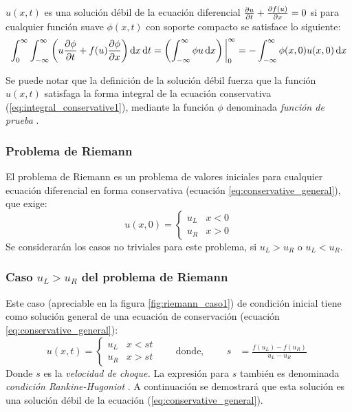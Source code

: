 \documentclass[12pt]{article}
\begin{document}
	
	
	\begin{definition}
		$u(x,t)$ es una solución débil de la ecuación diferencial $\pdv{u}{t} + \pdv{f(u)}{x}=0$ si para cualquier función suave $\phi(x,t)$ con soporte compacto se satisface lo siguiente:
		\begin{equation}
			\int_{0}^{\infty}\int_{-\infty}^{\infty}\left( u\pdv{\phi}{t} + f(u)\pdv{\phi}{x}\right)\dd{x}\dd{t}=\left( \int_{-\infty}^{\infty} \phi u \dd{x} \right)\bigg|_{0}^{\infty}=-\int_{-\infty}^{\infty}\phi (x,0)u(x,0)\dd{x}
			\label{eq:weak_sol_cond}
		\end{equation}
	\end{definition}
	Se puede notar que la definición de la solución débil fuerza que la función $u(x,t)$ satisfaga la forma integral de la ecuación conservativa (\ref{eq:integral_conservative1}), mediante la función $\phi$ denominada \textit{función de prueba} \cite{Cameron}.
	
	\subsubsection{Problema de Riemann}
	El problema de Riemann es un problema de valores iniciales para cualquier ecuación diferencial en forma conservativa (ecuación \ref{eq:conservative_general}), que exige:
	\begin{equation}
		u(x,0) =
		\begin{cases}
			u_{L} & x < 0 \\
			u_{R} & x > 0
		\end{cases}
	\end{equation}
	Se considerarán los casos no triviales para este problema, si $u_L > u_R$ o $u_L < u_R$.
	\subsubsection{Caso $u_L > u_R$ del problema de Riemann}
	Este caso (apreciable en la figura \ref{fig:riemann_caso1}) de condición inicial tiene como solución general de una ecuación de conservación (ecuación \ref{eq:conservative_general}):
	\begin{equation}
		u(x,t) =
		\begin{cases}
			u_{L} & x < st \\
			u_{R} & x > st
		\end{cases}
		\qquad \text{donde,}
		\qquad
		\begin{aligned}
			s &= \frac{f(u_L) - f(u_R)}{u_L - u_R}
		\end{aligned}
		\label{eq:sol-riemann-weak}
	\end{equation}
	Donde $s$ es la \textit{velocidad de choque.} La expresión para $s$ también es denominada \textit{condición Rankine-Hugoniot} \cite{Cameron}. A continuación se demostrará que esta solución es una solución débil de la ecuación (\ref{eq:conservative_general}).\\
		
\end{document}
